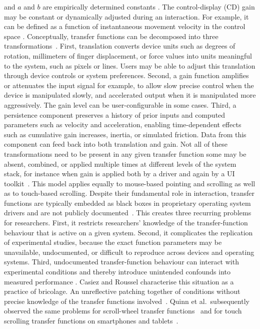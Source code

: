 \documentclass[12pt,a4paper]{report}
\begin{document}
        and $a$ and $b$ are empirically determined constants \cite{mackenzie1992fitts}. The control-display (CD) gain may be constant or dynamically adjusted during an interaction. For example, it can be defined as a function of instantaneous movement velocity in the control space \cite{casiez2011no}. Conceptually, transfer functions can be decomposed into three transformations~\cite{quinn2012exposing, quinn2013touch}. First, translation converts device units such as degrees of rotation, millimeters of finger displacement, or force values into units meaningful to the system, such as pixels or lines. Users may be able to adjust this translation through device controls or system preferences. Second, a gain function amplifies or attenuates the input signal for example, to allow slow precise control when the device is manipulated slowly, and accelerated output when it is manipulated more aggressively. The gain level can be user-configurable in some cases. Third, a persistence component preserves a history of prior inputs and computed parameters such as velocity and acceleration, enabling time-dependent effects such as cumulative gain increases, inertia, or simulated friction. Data from this component can feed back into both translation and gain. Not all of these transformations need to be present in any given transfer function some may be absent, combined, or applied multiple times at different levels of the system stack, for instance when gain is applied both by a driver and again by a UI toolkit~\cite{quinn2012exposing}. This model applies equally to mouse-based pointing and scrolling as well as to touch-based scrolling. Despite their fundamental role in interaction, transfer functions are typically embedded as black boxes in proprietary operating system drivers and are not publicly documented~\cite{quinn2012exposing, quinn2013touch}. This creates three recurring problems for researchers. First, it restricts researchers' knowledge of the transfer-function behaviour that is active on a given system. Second, it complicates the replication of experimental studies, because the exact function parameters may be unavailable, undocumented, or difficult to reproduce across devices and operating systems. Third, undocumented transfer-function behaviour can interact with experimental conditions and thereby introduce unintended confounds into measured performance \cite{casiez2011no,quinn2012exposing}. Casiez and Roussel characterise this situation as a practice of bricolage. An unreflective patching together of conditions without precise knowledge of the transfer functions involved~\cite{casiez2011no}. Quinn et al.\ subsequently observed the same problems for scroll-wheel transfer functions~\cite{quinn2012exposing} and for touch scrolling transfer functions on smartphones and tablets~\cite{quinn2013touch}.
\end{document}
